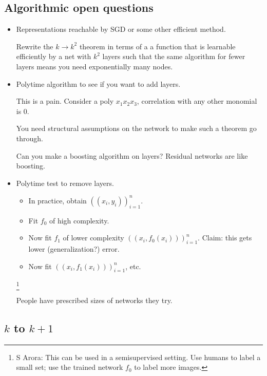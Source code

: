 
\subsection{Algorithmic open questions}

\begin{itemize}
\item
Representations reachable by SGD or some other efficient method. %

Rewrite the $k\to k^2$ theorem in terms of a a function that is learnable efficiently by  a net with $k^2$ layers such that the same algorithm for fewer layers means you need exponentially many nodes.
\item
Polytime algorithm to see if you want to add layers.

This is a pain. Consider a poly $x_1x_2x_3$, correlation with any other monomial is 0.

You need structural assumptions on the network to make such a theorem go through.

Can you make a boosting algorithm on layers? Residual networks are like boosting.
\item
Polytime test to remove layers.

\begin{itemize}
\item
In practice, obtain $((x_i,y_i))_{i=1}^n$. 
\item
Fit $f_0$ of high complexity.
\item
Now fit $f_1$ of lower complexity
$
((x_i, f_0(x_i)))_{i=1}^n.
$
Claim: this gets lower (generalization?) error.
\item Now fit $((x_i, f_1(x_i)))_{i=1}^n$, etc.
\end{itemize}
\footnote{S Arora:  This can be used in a semisupervised setting. Use humans to label a small set; use the trained network $f_0$ to label more images.}

People have prescribed sizes of networks they try.
\end{itemize}
\subsection{$k$ to $k+1$}


